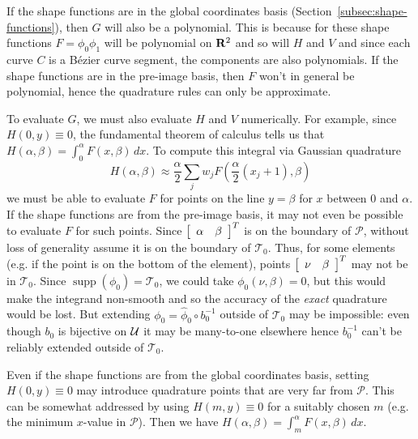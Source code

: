 If the shape functions are in the global coordinates basis
(Section~\ref{subsec:shape-functions}), then \(G\) will also be a polynomial.
This is because for these shape functions \(F = \phi_0 \phi_1\) will be
polynomial on \(\mathbf{R}^2\) and so will \(H\) and \(V\) and since each curve
\(C\) is a B\'{e}zier curve segment, the components are also polynomials.
If the shape functions are in the pre-image basis, then \(F\) won't in general
be polynomial, hence the quadrature rules can only be approximate.

To evaluate \(G\), we must also evaluate \(H\) and \(V\) numerically.
For example, since \(H(0, y) \equiv 0\),
the fundamental theorem of calculus tells us that
\(H\left(\alpha, \beta\right) = \int_0^{\alpha} F\left(x, \beta\right) \, dx\).
To compute this integral via Gaussian quadrature
\begin{equation}
H\left(\alpha, \beta\right) \approx \frac{\alpha}{2} \sum_j w_j
  F\left(\frac{\alpha}{2} (x_j + 1), \beta\right)
\end{equation}
we must be able to evaluate \(F\) for
points on the line \(y = \beta\) for \(x\) between \(0\) and \(\alpha\). If
the shape functions are from the pre-image basis, it may not even be possible
to evaluate \(F\) for such points. Since \(\left[\begin{array}{c c} \alpha &
\beta \end{array}\right]^T\) is on the boundary of \(\mathcal{P}\), without
loss of generality
assume it is on the boundary of \(\mathcal{T}_0\). Thus, for some elements
(e.g. if the point is on the bottom of the element), points
\(\left[\begin{array}{c c} \nu & \beta \end{array}\right]^T\) may not be
in \(\mathcal{T}_0\). Since \(\operatorname{supp}(\phi_0) = \mathcal{T}_0\),
we could take \(\phi_0(\nu, \beta) = 0\), but this would make the integrand
non-smooth and so the accuracy of the \textit{exact} quadrature would be
lost. But extending \(\phi_0 = \widehat{\phi}_0 \circ b_0^{-1}\) outside
of \(\mathcal{T}_0\) may be impossible: even though \(b_0\) is bijective on
\(\mathcal{U}\) it may be many-to-one elsewhere hence \(b_0^{-1}\) can't be
reliably extended outside of \(\mathcal{T}_0\).

Even if the shape functions are from the global coordinates basis,
setting \(H(0, y) \equiv 0\) may introduce quadrature points that
are very far from \(\mathcal{P}\). This can be somewhat addressed by using
\(H(m, y) \equiv 0\) for a suitably chosen \(m\) (e.g. the minimum
\(x\)-value in \(\mathcal{P}\)). Then we have
\(H\left(\alpha, \beta\right) = \int_m^{\alpha} F\left(x, \beta\right) \, dx\).

